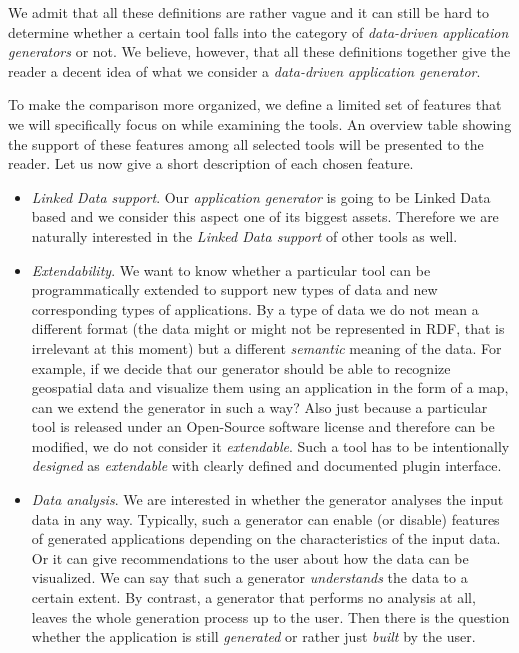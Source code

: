 We admit that all these definitions are rather vague and it can still be hard to determine whether a certain tool falls into the category of \emph{data-driven application generators} or not. We believe, however, that all these definitions together give the reader a decent idea of what we consider a \emph{data-driven application generator}.

To make the comparison more organized, we define a limited set of features that we will specifically focus on while examining the tools. An overview table showing the support of these features among all selected tools will be presented to the reader. Let us now give a short description of each chosen feature.

\begin{itemize}
\item \emph{Linked Data support}. Our \emph{application generator} is going to be Linked Data based and we consider this aspect one of its biggest assets. Therefore we are naturally interested in the \emph{Linked Data support} of other tools as well.
\item \emph{Extendability}. We want to know whether a particular tool can be programmatically extended to support new types of data and new corresponding types of applications. By a type of data we do not mean a different format (the data might or might not be represented in RDF, that is irrelevant at this moment) but a different \emph{semantic} meaning of the data. For example, if we decide that our generator should be able to recognize geospatial data and visualize them using an application in the form of a map, can we extend the generator in such a way? Also just because a particular tool is released under an Open-Source software license and therefore can be modified, we do not consider it \emph{extendable}. Such a tool has to be intentionally \emph{designed} as \emph{extendable} with clearly defined and documented plugin interface.
\item \emph{Data analysis}. We are interested in whether the generator analyses the input data in any way. Typically, such a generator can enable (or disable)  features of generated applications depending on the characteristics of the input data. Or it can give recommendations to the user about how the data can be visualized. We can say that such a generator \emph{understands} the data to a certain extent. By contrast, a generator that performs no analysis at all, leaves the whole generation process up to the user. Then there is the question whether the application is still \emph{generated} or rather just \emph{built} by the user.

\end{itemize}
